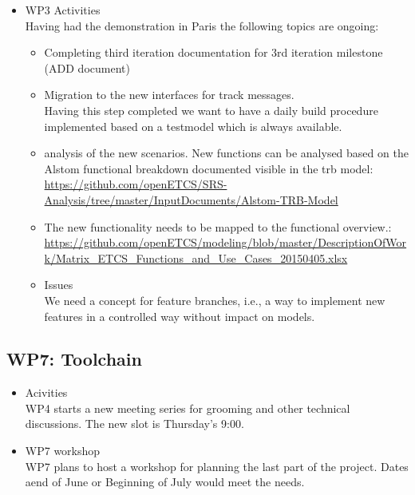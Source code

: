 \documentclass[a4paper, 11pt]{article}
\begin{document}
\begin{itemize}
\item WP3 Activities\\
Having had the demonstration in Paris the following topics are ongoing:
\begin{itemize}
\item Completing third iteration documentation for 3rd iteration milestone (ADD document)
\item Migration to the new interfaces for track messages.\\
Having this step completed we want to have a daily build procedure implemented based on a testmodel which is always available.

\item analysis of the new scenarios. New functions can be analysed based on the Alstom functional breakdown documented visible in the trb model:
\url{https://github.com/openETCS/SRS-Analysis/tree/master/InputDocuments/Alstom-TRB-Model} \\
\item The new functionality needs to be mapped to the functional overview.: \url{https://github.com/openETCS/modeling/blob/master/DescriptionOfWork/Matrix_ETCS_Functions_and_Use_Cases_20150405.xlsx}

\item Issues\\
We need a concept for feature branches, i.e., a way to implement new features in a controlled way without impact on models.

\end{itemize}

\end{itemize}

\subsection{WP7: Toolchain}

\begin{itemize}
\item Acivities\\
WP4 starts a new meeting series for grooming and other technical discussions. The new slot is  Thursday's 9:00. 
\item WP7 workshop\\
WP7 plans to host a workshop for planning the last part of the project. Dates aend of June or Beginning of July would meet the needs. 
\end{itemize}
\end{document}
